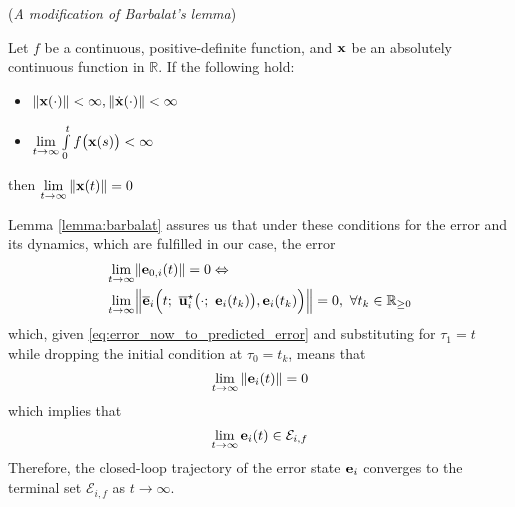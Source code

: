 \begin{bw_box}
  \begin{lemma} (\textit{A modification of Barbalat's lemma}\cite{Fontes2007})

    Let $f$ be a continuous, positive-definite function, and $\bm{\mathbf{x}}$ be an
    absolutely continuous function in $\mathbb{R}$. If the following hold:
  \begin{itemize}
    \item $\|\bm{\mathbf{x}}(\cdot)\| < \infty, \|\dot{\bm{\mathbf{x}}}(\cdot)\| < \infty$
    \item $\lim\limits_{t \to \infty} \int\limits_0^t f\big(\bm{\mathbf{x}}(s)\big) < \infty$
  \end{itemize}
  then $\lim\limits_{t \to \infty} \|\bm{\mathbf{x}}(t)\| = 0$
  \label{lemma:barbalat}
  \end{lemma}
\end{bw_box}
Lemma \eqref{lemma:barbalat} assures us that under these conditions for the
error and its dynamics, which are fulfilled in our case, the error
\begin{align}
  \lim\limits_{t \to \infty}&\|\vect{e}_{0,i}(t)\| = 0 \Leftrightarrow \\
  \lim\limits_{t \to \infty}
  &\Big\| \overline{\vect{e}}_i\Big(t;\ \overline{\vect{u}}_i^{\star}\big(\cdot;\ \vect{e}_i(t_k)\big), \vect{e}_i(t_k) \Big) \Big\| = 0,\
\forall t_k \in \mathbb{R}_{\geq 0}
\end{align}
which, given \eqref{eq:error_now_to_predicted_error} and substituting
for $\tau_1 = t$ while dropping the initial condition at $\tau_0 = t_k$, means that
$$\lim\limits_{t \to \infty}\|\bm{\mathbf{e}}_i(t)\| = 0$$
which implies that
$$\lim\limits_{t \to \infty}\bm{\mathbf{e}}_i(t) \in \mathcal{E}_{i,f}$$
Therefore, the closed-loop trajectory of the error state $\bm{\mathbf{e}}_i$ converges
to the terminal set $\mathcal{E}_{i,f}$ as $t \to \infty$.\\ \qedsymbol
